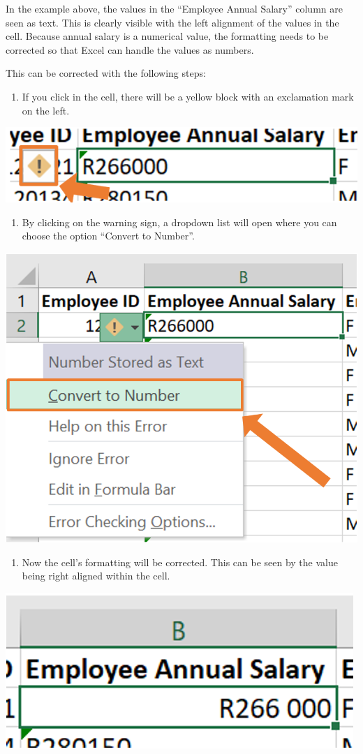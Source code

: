 \documentclass[
]{book}
\providecommand{\tightlist}{%
  \setlength{\itemsep}{0pt}\setlength{\parskip}{0pt}}
\begin{document}
In the example above, the values in the ``Employee Annual Salary'' column are seen as text. This is clearly visible with the left alignment of the values in the cell. Because annual salary is a numerical value, the formatting needs to be corrected so that Excel can handle the values as numbers.

This can be corrected with the following steps:

\begin{enumerate}
\def\labelenumi{\arabic{enumi}.}
\tightlist
\item
  If you click in the cell, there will be a yellow block with an exclamation mark on the left.
\end{enumerate}

\begin{center}\includegraphics[width=0.4\linewidth]{Figures/cleaning_formatting_1} \end{center}

\begin{enumerate}
\def\labelenumi{\arabic{enumi}.}
\setcounter{enumi}{1}
\tightlist
\item
  By clicking on the warning sign, a dropdown list will open where you can choose the option ``Convert to Number''.
\end{enumerate}

\begin{center}\includegraphics[width=0.4\linewidth]{Figures/cleaning_formatting_2} \end{center}

\begin{enumerate}
\def\labelenumi{\arabic{enumi}.}
\setcounter{enumi}{2}
\tightlist
\item
  Now the cell's formatting will be corrected. This can be seen by the value being right aligned within the cell.
\end{enumerate}

\begin{center}\includegraphics[width=0.4\linewidth]{Figures/cleaning_formatting_3} \end{center}
\end{document}
